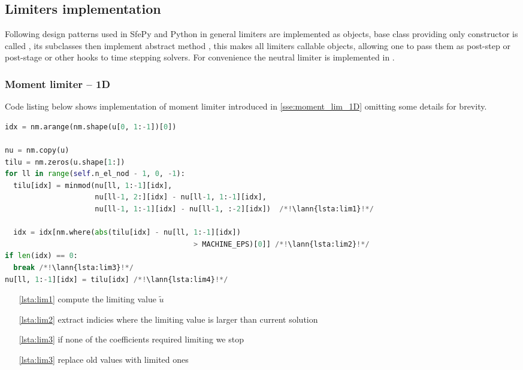 \subsection{Limiters implementation}
Following design patterns used in SfePy and Python in general limiters are implemented as objects, base class providing 
only constructor is called , its subclasses then implement abstract 
method , this makes all limiters callable objects, allowing one to pass 
them as post-step or post-stage or other hooks to time stepping solvers. For convenience 
the neutral limiter is implemented in .

\subsubsection{Moment limiter -- 1D}
\label{se:i_moment_lim_1D}
Code listing below shows implementation of moment limiter introduced in \ref{sse:moment_lim_1D} omitting some details 
for brevity.
\setcounter{lstannotation}{0}
\begin{lstlisting}[language=Python, caption=Moment limiter for 1D]
idx = nm.arange(nm.shape(u[0, 1:-1])[0])

nu = nm.copy(u)
tilu = nm.zeros(u.shape[1:])
for ll in range(self.n_el_nod - 1, 0, -1):
  tilu[idx] = minmod(nu[ll, 1:-1][idx], 
                     nu[ll-1, 2:][idx] - nu[ll-1, 1:-1][idx],
					 nu[ll-1, 1:-1][idx] - nu[ll-1, :-2][idx])  /*!\lann{lsta:lim1}!*/

  idx = idx[nm.where(abs(tilu[idx] - nu[ll, 1:-1][idx])
											> MACHINE_EPS)[0]] /*!\lann{lsta:lim2}!*/
if len(idx) == 0:
  break /*!\lann{lsta:lim3}!*/
nu[ll, 1:-1][idx] = tilu[idx] /*!\lann{lsta:lim4}!*/
\end{lstlisting}
\begin{itemize}
	\item [\ref{lsta:lim1}] compute the limiting value $\tilde{u}$
	\item [\ref{lsta:lim2}] extract indicies where the limiting value is larger than 
	current solution
	\item[\ref{lsta:lim3}] if none of the coefficients required limiting we stop
    \item [\ref{lsta:lim3}] replace old values with limited ones
	
\end{itemize}

